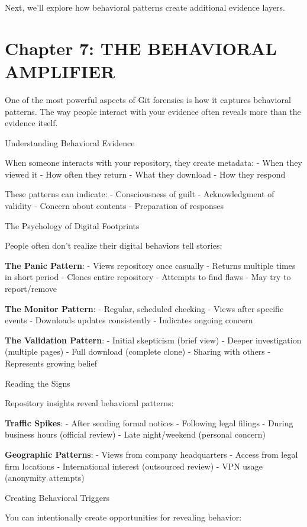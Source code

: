 Next, we'll explore how behavioral patterns create additional evidence
layers.

\section{Chapter 7: THE BEHAVIORAL
AMPLIFIER}\label{chapter-7-the-behavioral-amplifier}

One of the most powerful aspects of Git forensics is how it captures
behavioral patterns. The way people interact with your evidence often
reveals more than the evidence itself.

Understanding Behavioral Evidence

When someone interacts with your repository, they create metadata: -
When they viewed it - How often they return - What they download - How
they respond

These patterns can indicate: - Consciousness of guilt - Acknowledgment
of validity - Concern about contents - Preparation of responses

The Psychology of Digital Footprints

People often don't realize their digital behaviors tell stories:

\textbf{The Panic Pattern}: - Views repository once casually - Returns
multiple times in short period - Clones entire repository - Attempts to
find flaws - May try to report/remove

\textbf{The Monitor Pattern}: - Regular, scheduled checking - Views
after specific events - Downloads updates consistently - Indicates
ongoing concern

\textbf{The Validation Pattern}: - Initial skepticism (brief view) -
Deeper investigation (multiple pages) - Full download (complete clone) -
Sharing with others - Represents growing belief

Reading the Signs

Repository insights reveal behavioral patterns:

\textbf{Traffic Spikes}: - After sending formal notices - Following
legal filings - During business hours (official review) - Late
night/weekend (personal concern)

\textbf{Geographic Patterns}: - Views from company headquarters - Access
from legal firm locations - International interest (outsourced review) -
VPN usage (anonymity attempts)

Creating Behavioral Triggers

You can intentionally create opportunities for revealing behavior:

